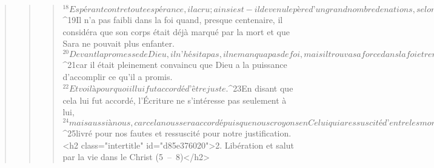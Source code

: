 \begin{verse}
\begin{verse}
\begin{verse}
${}^{18}Espérant contre toute espérance, il a cru ; ainsi est-il devenu le père d’un grand nombre de nations, selon cette parole : Telle sera la descendance que tu auras ! 
${}^{19}Il n’a pas faibli dans la foi quand, presque centenaire, il considéra que son corps était déjà marqué par la mort et que Sara ne pouvait plus enfanter. 
${}^{20}Devant la promesse de Dieu, il n’hésita pas, il ne manqua pas de foi, mais il trouva sa force dans la foi et rendit gloire à Dieu, 
${}^{21}car il était pleinement convaincu que Dieu a la puissance d’accomplir ce qu’il a promis. 
${}^{22}Et voilà pourquoi il lui fut accordé d’être juste. 
${}^{23}En disant que cela lui fut accordé, l’Écriture ne s’intéresse pas seulement à lui, 
${}^{24}mais aussi à nous, car cela nous sera accordé puisque nous croyons en Celui qui a ressuscité d’entre les morts Jésus notre Seigneur, 
${}^{25}livré pour nos fautes et ressuscité pour notre justification.
      <h2 class="intertitle" id="d85e376020">2. Libération et salut par la vie dans le Christ (5 – 8)</h2>
      

\end{verse}
\end{verse}
\end{verse}
